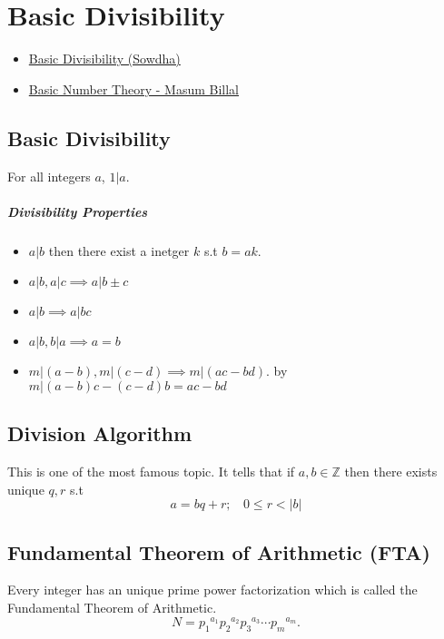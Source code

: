 \chapter{Basic Divisibility}%
\label{sec:divi}

\begin{linkb}
   \begin{itemize}
        \item \href{https://www.youtube.com/watch?v=2LoYjvi0MH4}{Basic Divisibility (Sowdha)}
        \item \href{https://drive.google.com/file/d/1YRvC4AQ2rwa4DsQxYd_7kHqyYZdrPQkX/view?usp=sharing}{Basic Number Theory - Masum Billal}
   \end{itemize}
\end{linkb}

\section{Basic Divisibility}
For all integers \(a\), \(1|a\). 

\paragraph{Divisibility Properties}
\begin{itemize}
	\item \(a|b\) then there exist a inetger \(k\) s.t \(b=ak\).
	\item \(a|b, a|c \implies a | b \pm c\)
	\item \(a|b \implies a | bc\)
	\item \(a|b, b|a \implies a=b\)
	\item \(m|(a-b), m|(c-d) \implies m|(ac-bd)\). by \(m|(a-b)c-(c-d)b=ac-bd \)
\end{itemize}

\section{Division Algorithm}
This is one of the most famous topic. It tells that if \(a, b \in \mathbb{Z}\) then there exists unique \(q,r\)
s.t \[a=bq+r; \ \ \ \ 0\le r<|b|\]



\section{Fundamental Theorem of Arithmetic (FTA)}
Every integer has an unique prime power factorization which is called the Fundamental Theorem of Arithmetic.
\[ N ={p_1}^{a_1} {p_2}^{a_2} {p_3}^{a_3} \cdots {p_m}^{a_m}. \]

